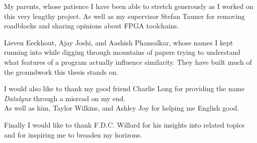 My parents, whose patience I have been able to stretch generously as I worked on this very lengthy project. As well as my supervisor Stefan Tauner for removing roadblocks and sharing opinions about FPGA toolchains.

Lieven Eeckhout, Ajay Joshi, and Aashish Phansalkar, whose names I kept running into while digging through mountains of papers trying to understand what features of a program actually influence similarity. They have built much of the groundwork this thesis stands on.

I would also like to thank my good friend Charlie Long for providing the name \emph{Datalynx} through a misread on my end.\\
As well as him, Taylor Wilkins, and Ashley Joy for helping me English good.

Finally I would like to thank F.D.C. Willard for his insights into related topics and for inspiring me to broaden my horizons.